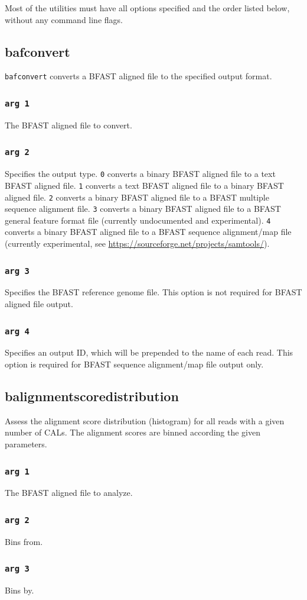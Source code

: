 \documentclass[a4paper,12pt]{book}
\newcommand{\TT}[1]{{\tt #1}} %
\newcommand{\BRGF}{BFAST reference genome file} %
\newcommand{\BAF}{BFAST aligned file} %
\newcommand{\BMAF}{BFAST multiple sequence alignment file} %
\newcommand{\BGFFF}{BFAST general feature format file} %
\newcommand{\BSAMF}{BFAST sequence alignment/map file} %
\begin{document}
Most of the utilities must have all options specified and the order listed below, without any command line flags. 

\subsection{bafconvert}
\label{sec:bafconvert}
\TT{bafconvert} converts a \BAF{} to the specified output format.
\subsubsection{\TT{arg 1}}
The \BAF{} to convert.
\subsubsection{\TT{arg 2}}
Specifies the output type.
\TT{0} converts a binary \BAF{} to a text \BAF{}.
\TT{1} converts a text \BAF{} to a binary \BAF{}.
\TT{2} converts a binary \BAF{} to a \BMAF{}.
\TT{3} converts a binary \BAF{} to a \BGFFF{} (currently undocumented and experimental).
\TT{4} converts a binary \BAF{} to a \BSAMF{} (currently experimental, see \url{https://sourceforge.net/projects/samtools/}).
\subsubsection{\TT{arg 3}}
Specifies the \BRGF{}.
This option is not required for \BAF{} output.
\subsubsection{\TT{arg 4}}
Specifies an output ID, which will be prepended to the name of each read.
This option is required for \BSAMF{} output only.
\subsection{balignmentscoredistribution}
\label{sec:balignmentscoredistribution}
Assess the alignment score distribution (histogram) for all reads with a given number of CALs.
The alignment scores are binned according the given parameters.
\subsubsection{\TT{arg 1}}
The \BAF{} to analyze.
\subsubsection{\TT{arg 2}}
Bins from.
\subsubsection{\TT{arg 3}}
Bins by.
\end{document}
